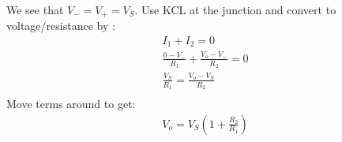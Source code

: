 \documentclass[10pt]{article}
\begin{document}
\begin{multicols}{2}
\begin{enumerate}
\begin{align*}
     \end{align*}
     We see that $V_-=V_+=V_S$. Use KCL at the junction and convert to voltage/resistance by : \\
     \begin{align*}
        I_1+I_2=0 \\
        \frac{0-V_-}{R_1} + \frac{V_o-V_-}{R_2} = 0 \\
        \frac{V_S}{R_1} = \frac{V_{o}-V_S}{R_2} \\
     \end{align*}
     Move terms around to get:
     \begin{align*}
         V_{o}=V_{S}(1+\frac{R_2}{R_{1}})
     \end{align*}
     
    
\end{enumerate}
\end{multicols}
\end{document}
